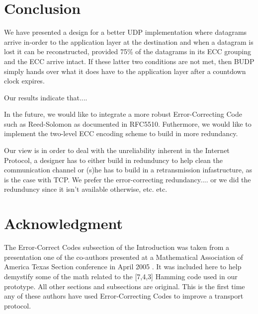 \documentclass[conference]{IEEEtran}
\theoremstyle{definition}
\begin{document}
\section{Conclusion}
We have presented a design for a better UDP implementation
where datagrams arrive in-order to the application layer
at the destination and when a datagram is lost it can be
reconstructed, provided 75\% of the datagrams in its ECC
grouping and the ECC arrive intact.  If these latter two
conditions are not met, then BUDP simply hands over what
it does have to the application layer after a countdown
clock expires.

Our results indicate that....


In the future, we would like to integrate a more robust
Error-Correcting Code such as Reed-Solomon as documented
in RFC5510.  Futhermore, we would like to implement the
two-level ECC encoding scheme to build in more redundancy.

Our view is in order to deal with the unreliability inherent
in the Internet Protocol, a designer has to either build
in redunduncy to help clean the communication channel or
(s)he has to build in a retransmission infastructure, as
is the case with TCP.  We prefer the error-correcting redundancy....
or we did the redunduncy since it isn't available otherwise, etc.
etc.






\section*{Acknowledgment}
The Error-Correct Codes subsection of the Introduction
was taken from a presentation one of the co-authors
presented at a Mathematical Association of America
Texas Section conference in April 2005 \cite{hill1986first}.  It was included
here to help demystify some of the math related to the
[7,4,3] Hamming code used in our prototype.  All other
sections and subsections are original.  This is the first
time any of these authors have used Error-Correcting Codes
to improve a transport protocol.




\end{document}
